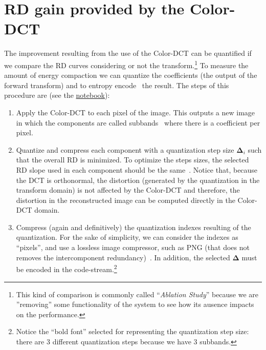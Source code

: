 


\section{RD gain provided by the Color-DCT}

The improvement resulting from the use of the Color-DCT can be
quantified if we compare the RD curves considering or not the
transform.\footnote{This kind of comparison is commonly called
``\emph{Ablation Study}'' because we are ''removing'' some
functionality of the system to see how its ausence impacts on the
performance.} To measure the amount of energy compaction we can
quantize the coefficients (the output of the forward transform) and to
entropy encode~\cite{vruiz__information_theory} the result. The steps
of this procedure are (see the
\href{https://github.com/Sistemas-Multimedia/Sistemas-Multimedia.github.io/blob/master/contents/color_DCT/RD_performance.ipynb}{notebook}):
\begin{enumerate}
\item Apply the Color-DCT to each pixel of the image. This outputs a
  new image in which the components are called
  subbands~\cite{vruiz__transform_coding} where there is a coefficient
  per pixel.
\item Quantize and compress each component with a quantization step
  size ${\mathbf\Delta}_i$ such that the overall RD is minimized. To
  optimize the steps sizes, the selected RD slope used in each
  component should be the
  same~\cite{vruiz__information_theory,vetterli2014foundations}. Notice
  that, because the DCT is orthonormal, the distortion (generated by
  the quantization in the transform domain) is not affected by the
  Color-DCT and therefore, the distortion in the reconstructed image
  can be computed directly in the Color-DCT domain.
\item Compress (again and definitively) the quantization indexes
  resulting of the quantization. For the sake of simplicity, we can
  consider the indexes as ``pixels'', and use a lossless image
  compressor, such as PNG (that does not removes the intercomponent
  redundancy)~\cite{vruiz__PNG}. In addition, the selected
  ${\mathbf\Delta}$ must be encoded in the
  code-stream.\footnote{Notice the ``bold font'' selected for
  representing the quantization step size: there are 3 different
  quantization steps because we have 3 subbands.}
\end{enumerate}

